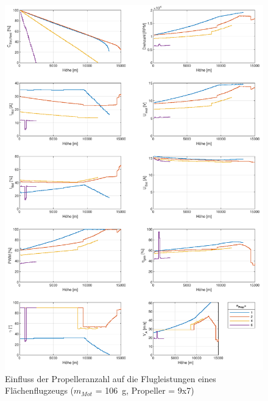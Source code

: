 \begin{figure}[H]
\centering
	\includegraphics[scale=0.7]{Diagramme/Flaechenflzg_n_prop.pdf}
	\caption{Einfluss der Propelleranzahl auf die Flugleistungen eines Flächenflugzeugs (\ensuremath{m_{Mot}} = \SI{106}{g}, Propeller = 9x7)}
	\label{abb:flaechenflzg_mot_prop}
\end{figure}


